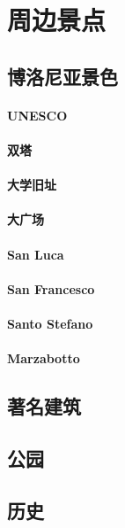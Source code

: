 \chapter{周边景点}              


\section{博洛尼亚景色}

\subsubsection{UNESCO}
\subsubsection{双塔}
\subsubsection{大学旧址}
\subsubsection{大广场}
\subsubsection{San Luca}
\subsubsection{San Francesco}
\subsubsection{Santo Stefano}
\subsubsection{Marzabotto}

\section{著名建筑}

\section{公园}

\section{历史}
